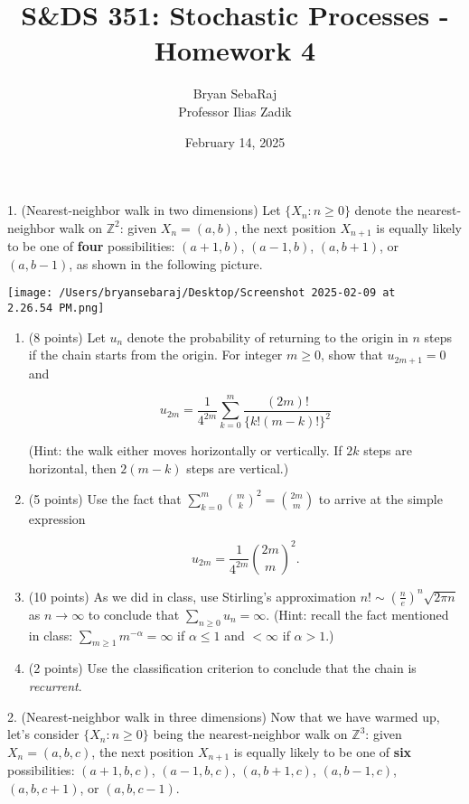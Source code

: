 \documentclass{article}
\title{S\&DS 351: Stochastic Processes - Homework 4}
\author{Bryan SebaRaj \\[0.8em] Professor Ilias Zadik}
\date{February 14, 2025}
\begin{document}
\maketitle

1. (Nearest-neighbor walk in two dimensions)
Let $\{X_n : n \geq 0\}$ denote the nearest-neighbor walk on $\mathbb{Z}^2$: given $X_n = (a,b)$, the next position $X_{n+1}$ is equally likely to be one of \textbf{four} possibilities: $(a+1,b)$, $(a-1,b)$, $(a,b+1)$, or $(a,b-1)$, as shown in the following picture.

\begin{center}
\texttt{[image: /Users/bryansebaraj/Desktop/Screenshot 2025-02-09 at 2.26.54 PM.png]}
\end{center}

\begin{enumerate}[label=(\alph*)]
    \item (8 points) Let $u_n$ denote the probability of returning to the origin in $n$ steps if the chain starts from the origin. For integer $m \geq 0$, show that $u_{2m+1} = 0$ and

\[
u_{2m} = \frac{1}{4^{2m}} \sum_{k=0}^{m} \frac{(2m)!}{\{k!(m-k)!\}^2}
\]

(Hint: the walk either moves horizontally or vertically. If $2k$ steps are horizontal, then $2(m-k)$ steps are vertical.)

\item (5 points) Use the fact that 
$\sum_{k=0}^{m} \binom{m}{k}^2 = \binom{2m}{m}$
to arrive at the simple expression

\[
u_{2m} = \frac{1}{4^{2m}} \binom{2m}{m}^2.
\]

\item (10 points) As we did in class, use Stirling’s approximation $n! \sim \left(\frac{n}{e}\right)^n \sqrt{2\pi n}$ as $n \to \infty$ to conclude that $\sum_{n \geq 0} u_n = \infty$. (Hint: recall the fact mentioned in class: $\sum_{m \geq 1} m^{-\alpha} = \infty$ if $\alpha \leq 1$ and $< \infty$ if $\alpha > 1$.)

\item (2 points) Use the classification criterion to conclude that the chain is \textit{recurrent}.
\end{enumerate}

2. (Nearest-neighbor walk in three dimensions)
Now that we have warmed up, let’s consider $\{X_n : n \geq 0\}$ being the nearest-neighbor walk on $\mathbb{Z}^3$: given $X_n = (a,b,c)$, the next position $X_{n+1}$ is equally likely to be one of \textbf{six} possibilities: $(a+1,b,c)$, $(a-1,b,c)$, $(a,b+1,c)$, $(a,b-1,c)$, $(a,b,c+1)$, or $(a,b,c-1)$.
\end{document}
